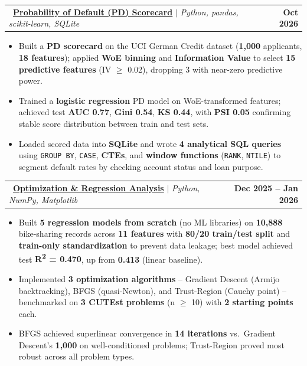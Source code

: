 \documentclass[letterpaper,11pt]{article}
\makeatletter
\newcommand{\resumeItem}[1]{
  \item\small{
    {#1 \vspace{-2pt}}
  }
}
\newcommand{\resumeProjectHeading}[2]{
    \item
    \begin{tabular*}{1.001\textwidth}{l@{\extracolsep{\fill}}r}
      \small#1 & \textbf{\small #2}\\
    \end{tabular*}\vspace{-5pt}
}
\newcommand{\resumeSubItem}[1]{\resumeItem{#1}\vspace{-2pt}}
\newcommand{\resumeItemListStart}{\begin{itemize}}
\newcommand{\resumeItemListEnd}{\end{itemize}\vspace{-3pt}}
\makeatother
\begin{document}
      \resumeProjectHeading{\faGithub\ \href{https://github.com/Ridwan-Umar/pd-scorecard}{\textbf{Probability of Default (PD) Scorecard}} $|$ \emph{Python, pandas, scikit-learn, SQLite}}{Oct 2026}
      \resumeItemListStart
        \resumeSubItem{Built a \textbf{PD scorecard} on the UCI German Credit dataset (\textbf{1,000} applicants, \textbf{18 features}); applied \textbf{WoE binning} and \textbf{Information Value} to select \textbf{15 predictive features} (IV $\geq$ 0.02), dropping 3 with near-zero predictive power.}
        \resumeSubItem{Trained a \textbf{logistic regression} PD model on WoE-transformed features; achieved test \textbf{AUC 0.77}, \textbf{Gini 0.54}, \textbf{KS 0.44}, with \textbf{PSI 0.05} confirming stable score distribution between train and test sets.}
        \resumeSubItem{Loaded scored data into \textbf{SQLite} and wrote \textbf{4 analytical SQL queries} using \texttt{GROUP BY}, \texttt{CASE}, \textbf{CTEs}, and \textbf{window functions} (\texttt{RANK}, \texttt{NTILE}) to segment default rates by checking account status and loan purpose.}
      \resumeItemListEnd
        \vspace{-14pt}
      \resumeProjectHeading{\faGithub\ \href{https://github.com/Ridwan-Umar/optimization-regression-analysis}{\textbf{Optimization \& Regression Analysis}} $|$ \emph{Python, NumPy, Matplotlib}}{Dec 2025 -- Jan 2026}
      \resumeItemListStart
        \resumeSubItem{Built \textbf{5 regression models from scratch} (no ML libraries) on \textbf{10,888} bike-sharing records across \textbf{11 features} with \textbf{80/20 train/test split} and \textbf{train-only standardization} to prevent data leakage; best model achieved test \textbf{R\textsuperscript{2} = 0.470}, up from \textbf{0.413} (linear baseline).}
        \resumeSubItem{Implemented \textbf{3 optimization algorithms} -- Gradient Descent (Armijo backtracking), BFGS (quasi-Newton), and Trust-Region (Cauchy point) -- benchmarked on \textbf{3 CUTEst problems} (n $\geq$ 10) with \textbf{2 starting points} each.}
        \resumeSubItem{BFGS achieved superlinear convergence in \textbf{14 iterations} vs.\ Gradient Descent's \textbf{1,000} on well-conditioned problems; Trust-Region proved most robust across all problem types.}
      \resumeItemListEnd
        \vspace{-14pt}
\end{document}
